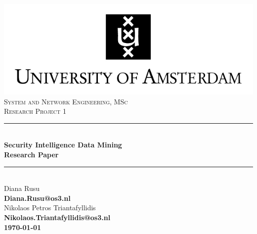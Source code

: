 \documentclass[12pt]{article}
\begin{document}
\begin{titlepage}

\newcommand{\HRule}{\rule{\linewidth}{0.5mm}} 
\center


\includegraphics{images/uva.jpeg}\\[0.5cm]%
 

\textsc{\Large System and Network Engineering, MSc}\\[0.5cm] 
\textsc { \large Research Project 1}\\[0.4cm] %

\HRule \\[0.4cm]
{ \huge \bfseries Security Intelligence Data Mining}\\[0.4cm] %
{ \large \bfseries Research Paper}\\[0.4cm] %
\HRule \\[0.4cm]






\large Diana Rusu\\
{\bfseries Diana.Rusu@os3.nl}\\[0.5cm]
\large Nikolaos Petros Triantafyllidis\\
\bfseries Nikolaos.Triantafyllidis@os3.nl\\[2cm]

{\large \today} 

\end{titlepage}
\newpage
\end{document}
